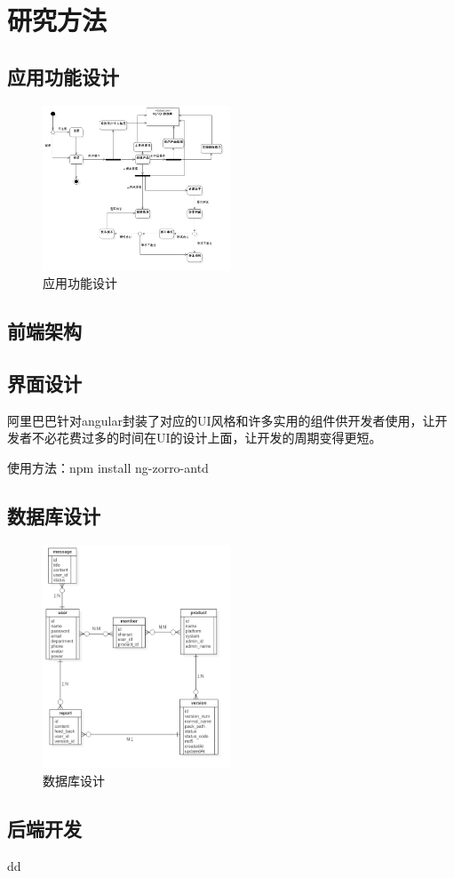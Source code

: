 \chapter{研究方法}
\label{cha:experiment}

\section{应用功能设计}
\label{sec:app_design}
\begin{figure}[h]
	\centering
	\includegraphics[width=0.5\textwidth]{image/UML/ActivityDiagram.png}
	\caption{应用功能设计}
	\label{fig:app}
\end{figure}
\section{前端架构}
\label{sec:Front-end_architecture}

\section{界面设计}
\label{sec:UI}
阿里巴巴针对angular封装了对应的UI风格和许多实用的组件供开发者使用，让开发者不必花费过多的时间在UI的设计上面，让开发的周期变得更短。

使用方法：npm install ng-zorro-antd
\section{数据库设计}
\label{sec:database_design}
\begin{figure}[h]
	\centering
	\includegraphics[width=0.5\textwidth]{image/UML/ERDDiagram.png}
	\caption{数据库设计}
	\label{fig:database}
\end{figure}
\section{后端开发}
\label{sec:Backend_development }
dd